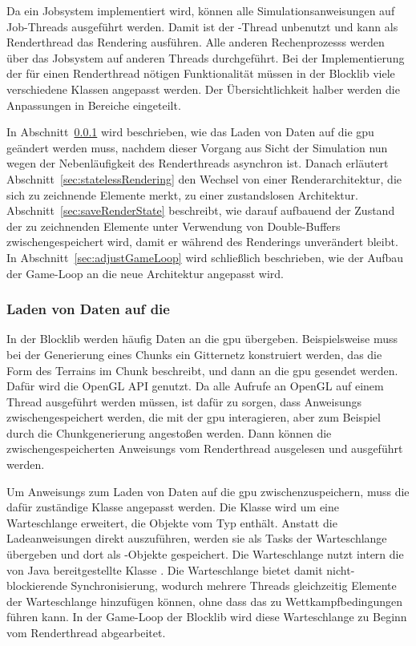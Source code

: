 Da ein Jobsystem implementiert wird, können alle Simulationsanweisungen auf Job-Threads ausgeführt werden. Damit ist der -Thread unbenutzt und kann als Renderthread das Rendering ausführen. Alle anderen \glspl{Rechenprozess} werden über das Jobsystem auf anderen Threads durchgeführt. Bei der Implementierung der für einen Renderthread nötigen Funktionalität müssen in der Blocklib viele verschiedene Klassen angepasst werden. Der Übersichtlichkeit halber werden die Anpassungen in Bereiche eingeteilt. 

In Abschnitt~\ref{sec:loader} wird beschrieben, wie das Laden von Daten auf die \ac{gpu} geändert werden muss, nachdem dieser Vorgang aus Sicht der Simulation nun wegen der Nebenläufigkeit des Renderthreads asynchron ist. Danach erläutert Abschnitt~\ref{sec:statelessRendering} den Wechsel von einer Renderarchitektur, die sich zu zeichnende Elemente merkt, zu einer zustandslosen Architektur. Abschnitt~\ref{sec:saveRenderState} beschreibt, wie darauf aufbauend der Zustand der zu zeichnenden Elemente unter Verwendung von Double-Buffers zwischengespeichert wird, damit er während des Renderings unverändert bleibt. In Abschnitt~\ref{sec:adjustGameLoop} wird schließlich beschrieben, wie der Aufbau der Game-Loop an die neue Architektur angepasst wird.

\subsubsection{Laden von Daten auf die }\label{sec:loader}
In der Blocklib werden häufig Daten an die \ac{gpu} übergeben. Beispielsweise muss bei der Generierung eines Chunks ein Gitternetz konstruiert werden, das die Form des Terrains im Chunk beschreibt, und dann an die \ac{gpu} gesendet werden. Dafür wird die OpenGL API genutzt. Da alle Aufrufe an OpenGL auf einem Thread ausgeführt werden müssen, ist dafür zu sorgen, dass \glspl{Anweisung} zwischengespeichert werden, die mit der \ac{gpu} interagieren, aber zum Beispiel durch die Chunkgenerierung angestoßen werden. Dann können die zwischengespeicherten \glspl{Anweisung} vom Renderthread ausgelesen und ausgeführt werden. 

Um \glspl{Anweisung} zum Laden von Daten auf die \ac{gpu} zwischenzuspeichern, muss die dafür zuständige Klasse  angepasst werden. Die Klasse wird um eine Warteschlange erweitert, die Objekte vom Typ  enthält. Anstatt die Ladeanweisungen direkt auszuführen, werden sie als Tasks der Warteschlange übergeben und dort als -Objekte gespeichert. Die Warteschlange nutzt intern die von Java bereitgestellte Klasse . Die Warteschlange bietet damit nicht-blockierende Synchronisierung, wodurch mehrere Threads gleichzeitig Elemente der Warteschlange hinzufügen können, ohne dass das zu Wettkampfbedingungen führen kann. In der Game-Loop der Blocklib wird diese Warteschlange zu Beginn vom Renderthread abgearbeitet.

